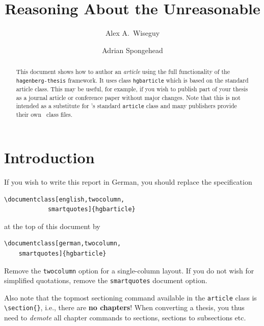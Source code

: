 \documentclass[english,twocolumn,smartquotes]{hgbarticle}
\begin{document}

\author{
	Alex A.\ Wiseguy\\ 
	\and
	Adrian Spongehead\\
}
\title{Reasoning About the Unreasonable}
\date{}

\maketitle

\begin{abstract}\noindent
This document shows how to author an \emph{article} using the full functionality
of the \texttt{hagenberg-thesis} framework. It uses class \texttt{hgb\-article} which is based
on the standard \latex \textsf{article} class. This may be useful, for example, if you wish to
publish part of your thesis as a journal article or conference paper without major changes.
Note that this is not intended as a substitute for \latex's standard \texttt{article}
class and many publishers provide their own \latex\ class files.
\end{abstract}


\section{Introduction}

If you wish to write this report in German, you should replace the specification
%
\begin{verbatim}
\documentclass[english,twocolumn,
            smartquotes]{hgbarticle}
\end{verbatim}
%
at the top of this document by
%
\begin{verbatim}
\documentclass[german,twocolumn,
    smartquotes]{hgbarticle}
\end{verbatim}
%
Remove the \texttt{twocolumn} option for a single-column layout. If you do not
wish for simplified quotations, remove the \texttt{smartquotes} document option.

Also note that the topmost sectioning command available in the \texttt{article}
class is \verb!\section{}!, i.e., there are \textbf{no chapters}!
When converting a thesis, you thus need to \emph{demote} all chapter commands to
sections, sections to subsections etc.
\end{document}
